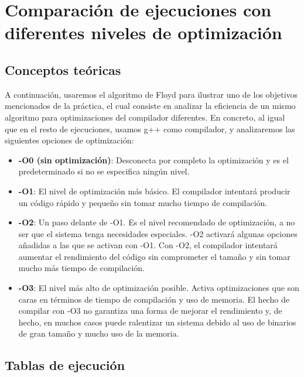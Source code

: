 \documentclass{homework}
\begin{document}
    \section{Comparación de ejecuciones con diferentes niveles de optimización}

    \subsection{Conceptos teóricas}

    A continuación, usaremos el algoritmo de Floyd para ilustrar uno de los objetivos mencionados de la práctica, 
    el cual consiste en analizar la eficiencia de un mismo algoritmo para optimizaciones del compilador diferentes.
    En concreto, al igual que en el resto de ejecuciones, usamos g++ como compilador, y analizaremos las siguientes
    opciones de optimización:

    \begin{itemize}
        \item \textbf{-O0 (sin optimización)}: Desconecta por completo la optimización y es el predeterminado si 
        no se especifica ningún nivel.
        \item \textbf{-O1}: El nivel de optimización más básico. El compilador intentará producir un código rápido
        y pequeño sin tomar mucho tiempo de compilación. 
        \item \textbf{-O2}: Un paso delante de -O1. Es el nivel recomendado de optimización, a no ser que el sistema
        tenga necesidades especiales. -O2 activará algunas opciones añadidas a las que se activan con -O1. 
        Con -O2, el compilador intentará aumentar el rendimiento del código sin comprometer el tamaño y sin tomar 
        mucho más tiempo de compilación.
        \item \textbf{-O3}:  El nivel más alto de optimización posible. Activa optimizaciones que son caras en términos 
        de tiempo de compilación y uso de memoria. El hecho de compilar con -O3 no garantiza una forma de mejorar el 
        rendimiento y, de hecho, en muchos casos puede ralentizar un sistema debido al uso de binarios de gran tamaño y 
        mucho uso de la memoria.
    \end{itemize} 
    
    \subsection{Tablas de ejecución} 

\end{document}

